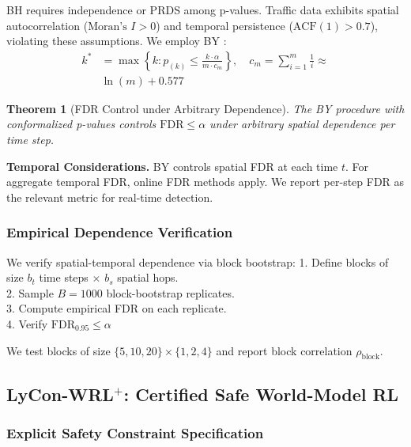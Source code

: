 \documentclass{article}
\theoremstyle{plain}
\newtheorem{theorem}{Theorem}[section]
\theoremstyle{definition}
\theoremstyle{remark}
\begin{document}
BH requires independence or PRDS among p-values. Traffic data exhibits spatial autocorrelation ($\text{Moran's } I > 0$) and temporal persistence ($\text{ACF}(1) > 0.7$), violating these assumptions. We employ BY \citep{benjamini2001control}:
\begin{equation}
\begin{aligned}
k^* &= \max\left\{k : p_{(k)} \leq \frac{k \cdot \alpha}{m \cdot c_m}\right\}, \quad
c_m = \sum_{i=1}^m \frac{1}{i} \approx \\
&\ln(m) + 0.577
\end{aligned}
\label{eq:by}
\end{equation}


\begin{theorem}[FDR Control under Arbitrary Dependence]
\label{thm:fdr}
The BY procedure with conformalized p-values controls $\text{FDR} \leq \alpha$ under arbitrary spatial dependence per time step.
\end{theorem}

\textbf{Temporal Considerations.} BY controls spatial FDR at each time $t$. For aggregate temporal FDR, online FDR methods \citep{ramdas2017online,javanmard2018online} apply. We report per-step FDR as the relevant metric for real-time detection.

\subsubsection{Empirical Dependence Verification}

We verify spatial-temporal dependence via block bootstrap:
1. Define blocks of size $b_t$ time steps $\times$ $b_s$ spatial hops.\\
2. Sample $B = 1000$ block-bootstrap replicates.\\
3. Compute empirical FDR on each replicate.\\
4. Verify $\text{FDR}_{0.95} \leq \alpha$

We test blocks of size $\{5, 10, 20\} \times \{1, 2, 4\}$ and report block correlation $\rho_{\text{block}}$.

\subsection{LyCon-WRL$^+$: Certified Safe World-Model RL}
\label{sec:lycon}

\subsubsection{Explicit Safety Constraint Specification}
\end{document}
